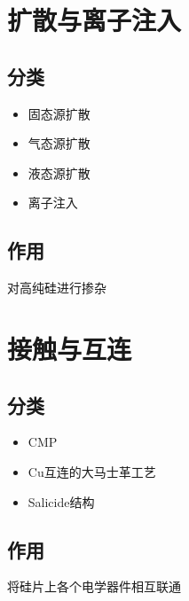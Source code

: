 \documentclass[utf8]{ctexart}
\begin{document}
	\section{扩散与离子注入}
		\subsection{分类}
			\begin{itemize}
				\item{固态源扩散}
				\item{气态源扩散}
				\item{液态源扩散}
				\item{离子注入}
			\end{itemize}
		\subsection{作用}
			对高纯硅进行掺杂
	\section{接触与互连}
		\subsection{分类}
			\begin{itemize}
				\item{CMP}
				\item{Cu互连的大马士革工艺}
				\item{Salicide结构}
			\end{itemize}
		\subsection{作用}
			将硅片上各个电学器件相互联通
\end{document}
